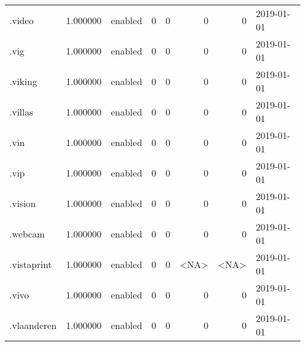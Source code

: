 \begin{tabular}{lrlrrrrl}
.video                    &          1.000000 &         enabled &                           0 &                           0 &                           0 &                   0 &           2019-01-01 \\
.vig                      &          1.000000 &         enabled &                           0 &                           0 &                           0 &                   0 &           2019-01-01 \\
.viking                   &          1.000000 &         enabled &                           0 &                           0 &                           0 &                   0 &           2019-01-01 \\
.villas                   &          1.000000 &         enabled &                           0 &                           0 &                           0 &                   0 &           2019-01-01 \\
.vin                      &          1.000000 &         enabled &                           0 &                           0 &                           0 &                   0 &           2019-01-01 \\
.vip                      &          1.000000 &         enabled &                           0 &                           0 &                           0 &                   0 &           2019-01-01 \\
.vision                   &          1.000000 &         enabled &                           0 &                           0 &                           0 &                   0 &           2019-01-01 \\
.webcam                   &          1.000000 &         enabled &                           0 &                           0 &                           0 &                   0 &           2019-01-01 \\
.vistaprint               &          1.000000 &         enabled &                           0 &                           0 &                        <NA> &                <NA> &           2019-01-01 \\
.vivo                     &          1.000000 &         enabled &                           0 &                           0 &                           0 &                   0 &           2019-01-01 \\
.vlaanderen               &          1.000000 &         enabled &                           0 &                           0 &                           0 &                   0 &           2019-01-01 \\

\end{tabular}
